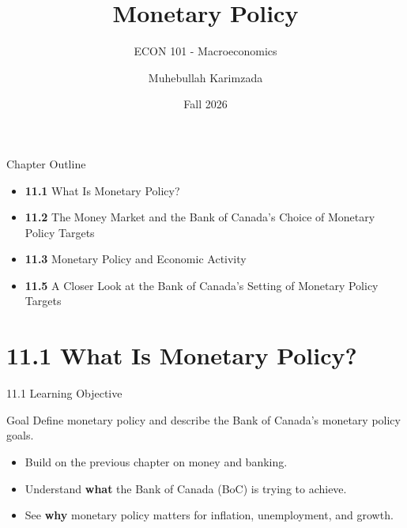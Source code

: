 \documentclass[aspectratio=169]{beamer}
\title{\textbf{Monetary Policy \vspace{.5cm}\\  }}
\subtitle{ {\large ECON 101 - Macroeconomics}}
\author{Muhebullah Karimzada}
\date{Fall 2026}
\begin{document}
\begin{frame}[plain]
  \titlepage
\end{frame}

\begin{frame}{Chapter Outline}
\transfade
\begin{itemize}[<+->]
  \item \textbf{11.1} What Is Monetary Policy?
  \item \textbf{11.2} The Money Market and the Bank of Canada’s Choice of Monetary Policy Targets
  \item \textbf{11.3} Monetary Policy and Economic Activity
  \item \textbf{11.5} A Closer Look at the Bank of Canada’s Setting of Monetary Policy Targets
\end{itemize}
\end{frame}

\section{11.1 What Is Monetary Policy?}

\begin{frame}{11.1 Learning Objective}
\transfade
\begin{block}{Goal}
Define monetary policy and describe the Bank of Canada’s monetary policy goals.
\end{block}
\begin{itemize}[<+->]
  \item Build on the previous chapter on money and banking.
  \item Understand \textbf{what} the Bank of Canada (BoC) is trying to achieve.
  \item See \textbf{why} monetary policy matters for inflation, unemployment, and growth.
\end{itemize}
\end{frame}
\end{document}
